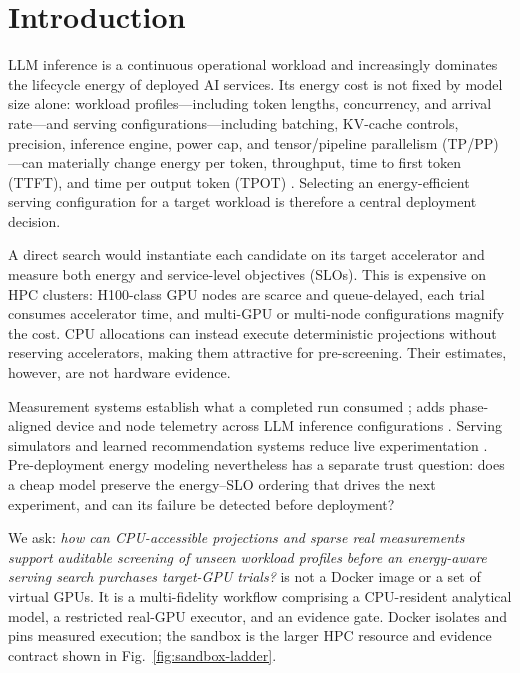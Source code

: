 \section{Introduction}

LLM inference is a continuous operational workload and increasingly dominates
the lifecycle energy of deployed AI services.  Its energy cost is not fixed by
model size alone: workload profiles---including token lengths, concurrency,
and arrival rate---and serving configurations---including batching, KV-cache
controls, precision, inference engine, power cap, and tensor/pipeline
parallelism (TP/PP)---can materially change energy per token, throughput, time
to first token (TTFT), and time per output token (TPOT)
\cite{niu2026tokenpowerbench}.  Selecting an energy-efficient serving
configuration for a target workload is therefore a central deployment
decision.

A direct search would instantiate each candidate on its target accelerator and
measure both energy and service-level objectives (SLOs).  This is expensive on
HPC clusters: H100-class GPU nodes are scarce and queue-delayed, each trial
consumes accelerator time, and multi-GPU or multi-node configurations magnify
the cost.  CPU allocations can instead execute deterministic projections
without reserving accelerators, making them attractive for pre-screening.
Their estimates, however, are not hardware evidence.

Measurement systems establish what a completed run consumed
\cite{samsi2023words,fernandez2025energy,chung2025mlenergy}; \bench{} adds
phase-aligned device and node telemetry across LLM inference configurations
\cite{niu2026tokenpowerbench}.  Serving simulators and learned recommendation
systems reduce live experimentation \cite{agrawal2024vidur,lazuka2024llmpilot,
yang2026charon}.  Pre-deployment energy modeling nevertheless has a separate
trust question: does a cheap model preserve the energy--SLO ordering that drives
the next experiment, and can its failure be detected before deployment?

We ask: \emph{how can CPU-accessible projections and sparse real measurements
support auditable screening of unseen workload profiles before an energy-aware
serving search purchases target-GPU trials?}  \system{} is not a Docker image
or a set of virtual GPUs.  It is a multi-fidelity workflow comprising a
CPU-resident analytical model, a restricted real-GPU executor, and an evidence
gate.  Docker isolates and pins measured execution; the sandbox is the larger
HPC resource and evidence contract shown in Fig.~\ref{fig:sandbox-ladder}.

